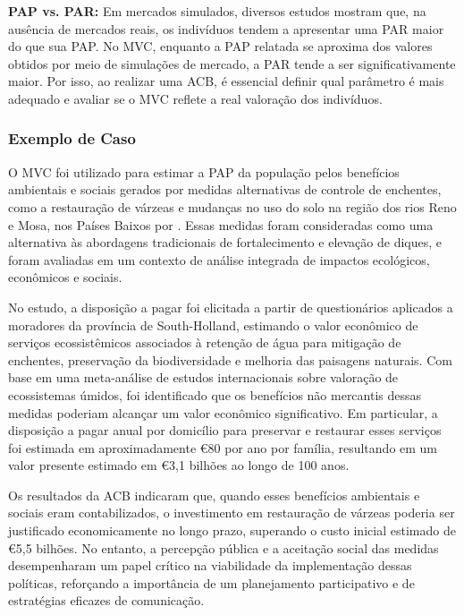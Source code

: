 \documentclass[12pt,letterpaper]{article}
\newcommand{\1}{\mathbbm{1}}
\numberwithin{equation}{section}
\begin{document}
\textbf{PAP vs. PAR:} Em mercados simulados, diversos estudos mostram que, na ausência de mercados reais, os indivíduos tendem a apresentar uma PAR maior do que sua PAP. No MVC, enquanto a PAP relatada se aproxima dos valores obtidos por meio de simulações de mercado, a PAR tende a ser significativamente maior. Por isso, ao realizar uma ACB, é essencial definir qual parâmetro é mais adequado e avaliar se o MVC reflete a real valoração dos indivíduos.

\subsubsection{Exemplo de Caso}

 O MVC foi utilizado para estimar a PAP da população pelos benefícios ambientais e sociais gerados por medidas alternativas de controle de enchentes, como a restauração de várzeas e mudanças no uso do solo na região dos rios Reno e Mosa, nos Países Baixos por \textcite{Brouwer2004}. Essas medidas foram consideradas como uma alternativa às abordagens tradicionais de fortalecimento e elevação de diques, e foram avaliadas em um contexto de análise integrada de impactos ecológicos, econômicos e sociais.

No estudo, a disposição a pagar foi elicitada a partir de questionários aplicados a moradores da província de South-Holland, estimando o valor econômico de serviços ecossistêmicos associados à retenção de água para mitigação de enchentes, preservação da biodiversidade e melhoria das paisagens naturais. Com base em uma meta-análise de estudos internacionais sobre valoração de ecossistemas úmidos, foi identificado que os benefícios não mercantis dessas medidas poderiam alcançar um valor econômico significativo. Em particular, a disposição a pagar anual por domicílio para preservar e restaurar esses serviços foi estimada em aproximadamente €80 por ano por família, resultando em um valor presente estimado em €3,1 bilhões ao longo de 100 anos.

Os resultados da ACB indicaram que, quando esses benefícios ambientais e sociais eram contabilizados, o investimento em restauração de várzeas poderia ser justificado economicamente no longo prazo, superando o custo inicial estimado de €5,5 bilhões. No entanto, a percepção pública e a aceitação social das medidas desempenharam um papel crítico na viabilidade da implementação dessas políticas, reforçando a importância de um planejamento participativo e de estratégias eficazes de comunicação.
\end{document}

